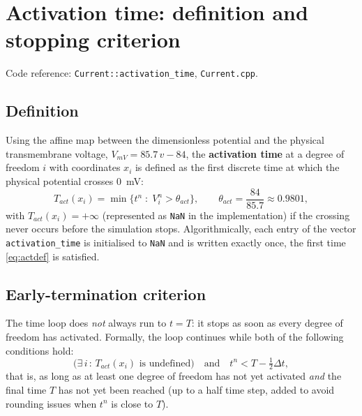 \documentclass{Configuration_Files/PoliMi3i_thesis}
\begin{document}

\section{Activation time: definition and stopping criterion }

Code reference: \texttt{Current::activation\_time}, \texttt{Current.cpp}.

\subsection{Definition}
Using the affine map between the dimensionless potential and the physical transmembrane
voltage, $V_{mV} = 85.7\,v - 84$, the \textbf{activation time} at a
degree of freedom $i$ with coordinates $x_i$ is defined as the first discrete time at which
the physical potential crosses $0$~mV:
\begin{equation}
T_{act}(x_i) = \min\Big\{ t^n \;:\; V^n_i > \theta_{act} \Big\}, \qquad
\theta_{act} = \frac{84}{85.7}\approx 0.9801,
\label{eq:actdef}
\end{equation}
with $T_{act}(x_i)=+\infty$ (represented as \texttt{NaN} in the implementation) if the
crossing never occurs before the simulation stops. Algorithmically, each entry of the
vector \texttt{activation\_time} is initialised to \texttt{NaN} and is written exactly once, the first
time \eqref{eq:actdef} is satisfied.

\subsection{Early-termination criterion}
The time loop does \emph{not} always run to $t = T$: it stops as soon as
every degree of freedom has activated. Formally, the loop continues while
both of the following conditions hold:
\[
\Big(\exists\, i \,:\, T_{act}(x_i) \text{ is undefined}\Big)
\quad \text{and} \quad
t^n < T - \tfrac{1}{2}\Delta t,
\tag{1.16}
\]
that is, as long as at least one degree of freedom has not yet activated
\emph{and} the final time $T$ has not yet been reached (up to a half time
step, added to avoid rounding issues when $t^n$ is close to $T$).
\end{document}
